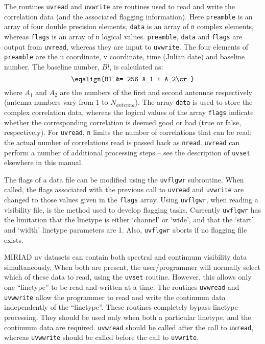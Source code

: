 
The routines {\tt uvread} and {\tt uvwrite} are routines used to read and
write the correlation data (and the associated flagging information).
Here {\tt preamble} is an array of four double precision elements, {\tt data}
is an array of {\tt n} 
complex elements, whereas {\tt flags} is an array of {\tt n} logical values.
{\tt preamble}, {\tt data} and {\tt flags} are output from {\tt uvread},
whereas they are input to {\tt uvwrite}. The four elements of
{\tt preamble} are the u coordinate, v coordinate, time (Julian date) and
baseline number. The baseline number, $Bl$, is calculated  as:
$$\eqalign{Bl &= 256 A_1 + A_2\cr}$$
where $A_1$ and $A_2$ are the numbers of the first and second antennae
respectively (antenna numbers vary from 1 to $N_{antenna}$). The array
{\tt data} is used to store the complex correlation data, whereas the logical
values of the array
{\tt flags} indicate whether the corresponding correlation is
deemed good or bad (true or false, respectively). For {\tt uvread}, {\tt n}
limits the number of correlations that can be read; the actual number of
correlations read is passed back as {\tt nread}. {\tt uvread} can perform
a number of additional processing steps -- see the description of
{\tt uvset} elsewhere in this manual.

The flags of a data file can be modified using the {\tt uvflgwr} subroutine.
When called, the flags associated with the previous call to
{\tt uvread} and {\tt uvwrite} are changed to those values given in the
{\tt flags} array. Using {\tt uvflgwr}, when reading a visibility file,
is the method used to develop flagging tasks.  Currently {\tt uvflgwr}
has the limitation that the linetype is either `channel' or `wide', and that
the `start' and `width' linetype parameters are 1.  Also, {\tt uvflgwr}
aborts if no flagging file exists.


MIRIAD uv datasets can contain both spectral and continuum visibility
data simultaneously. When both are present, the user/programmer will
normally select which of these data to read, using the {\tt uvset} routine.
However, this allows only one ``linetype'' to be
read and written at a time. The routines {\tt uvwread} and {\tt uvwwrite}
allow the programmer to read and write the continuum data independently
of the ``linetype''. These routines completely bypass linetype processing.
They should be used only when both a particular linetype, and the continuum
data are required. {\tt uvwread} should be called after the call to
{\tt uvread}, whereas {\tt uvwwrite} should be called before the call to
{\tt uvwrite}.

